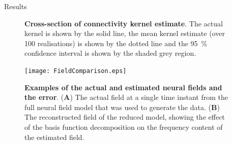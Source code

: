 \documentclass[final]{beamer}
\newlength{\sepwid}
\newlength{\onecolwid}
\begin{document}
\begin{frame}[t]
\begin{columns}[t]
\begin{column}{\onecolwid}
\begin{block}{Results}
\begin{figure}
\begin{center}
		\end{center}
		\caption{{\bf Cross-section of connectivity kernel estimate}. The actual kernel is shown by the solid line, the mean kernel estimate (over 100 realisations) is shown by the dotted line and the 95~\% confidence interval is shown by the shaded grey region.}
		\label{fig:Figure8}
		\end{figure}
				
		\begin{figure}
		\begin{center}
		\texttt{[image: FieldComparison.eps]}
		\end{center}
		\caption{{\bf Examples of the actual and estimated neural fields and the error}. (\textbf{A}) The actual field at a single time instant from the full neural field model that was used to generate the data. (\textbf{B}) The reconstructed field of the reduced model, showing the effect of the basis function decomposition on the frequency content of the estimated field.}
		\label{fig:Figure10}
		\end{figure}
		
	\end{block}
\end{column}

	\begin{column}{\sepwid}\end{column}			%

 \end{columns}
\end{frame}
\end{document}
